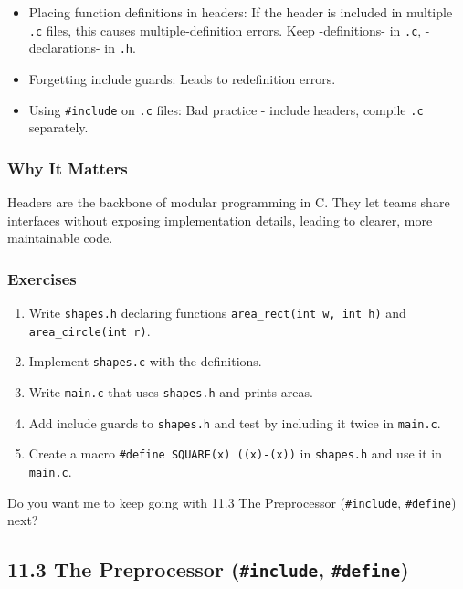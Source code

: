 \documentclass[
  letterpaper,
  DIV=11,
  numbers=noendperiod]{scrreprt}
\providecommand{\tightlist}{%
  \setlength{\itemsep}{0pt}\setlength{\parskip}{0pt}}
\begin{document}
\begin{itemize}
\tightlist
\item
  Placing function definitions in headers: If the header is included in
  multiple \texttt{.c} files, this causes multiple-definition errors.
  Keep -definitions- in \texttt{.c}, -declarations- in \texttt{.h}.
\item
  Forgetting include guards: Leads to redefinition errors.
\item
  Using \texttt{\#include} on \texttt{.c} files: Bad practice - include
  headers, compile \texttt{.c} separately.
\end{itemize}

\subsubsection{Why It Matters}\label{why-it-matters-48}

Headers are the backbone of modular programming in C. They let teams
share interfaces without exposing implementation details, leading to
clearer, more maintainable code.

\subsubsection{Exercises}\label{exercises-51}

\begin{enumerate}
\def\labelenumi{\arabic{enumi}.}
\tightlist
\item
  Write \texttt{shapes.h} declaring functions
  \texttt{area\_rect(int\ w,\ int\ h)} and
  \texttt{area\_circle(int\ r)}.
\item
  Implement \texttt{shapes.c} with the definitions.
\item
  Write \texttt{main.c} that uses \texttt{shapes.h} and prints areas.
\item
  Add include guards to \texttt{shapes.h} and test by including it twice
  in \texttt{main.c}.
\item
  Create a macro \texttt{\#define\ SQUARE(x)\ ((x)-(x))} in
  \texttt{shapes.h} and use it in \texttt{main.c}.
\end{enumerate}

Do you want me to keep going with 11.3 The Preprocessor
(\texttt{\#include}, \texttt{\#define}) next?

\subsection{\texorpdfstring{11.3 The Preprocessor (\texttt{\#include},
\texttt{\#define})}{11.3 The Preprocessor (\#include, \#define)}}\label{the-preprocessor-include-define}
\end{document}
